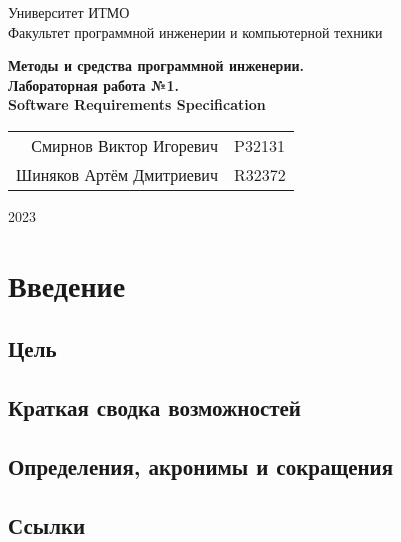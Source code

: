 \documentclass{article}
\begin{document}
\begin{titlepage}
  \begin{center}
    \begin{spacing}{1.4}
      \large{Университет ИТМО} \\
      \large{Факультет программной инженерии и компьютерной техники} \\
    \end{spacing}    
    \vfill
    \textbf{
      \huge{Методы и средства программной инженерии.} \\
      \huge{Лабораторная работа №1.} \\
      \huge{Software Requirements Specification} \\
    }
  \end{center}
  \vfill
  \begin{center}
    \begin{tabular}{r l}
      Смирнов Виктор Игоревич  & P32131 \\
      Шиняков Артём Дмитриевич & R32372 \\
    \end{tabular}
  \end{center}
  \vfill
  \begin{center}
    \begin{large}
      2023
    \end{large}
  \end{center}
\end{titlepage}


\section{Введение}

  \subsection{Цель}
  

  \subsection{Краткая сводка возможностей}
  

  \subsection{Определения, акронимы и сокращения}
  

  \subsection{Ссылки}
  
\end{document}

